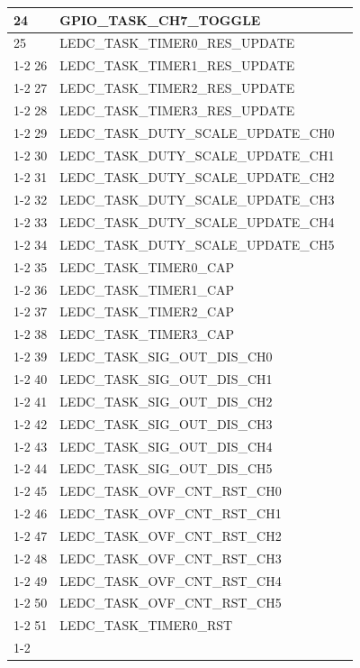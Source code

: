 \documentclass[main\_\_CN.tex]{subfiles}
\begin{document}
\begin{longtable}{ | l | l | l | }
24  & GPIO\_TASK\_CH7\_TOGGLE  &  \\ \hline
25  & LEDC\_TASK\_TIMER0\_RES\_UPDATE      & \nameref{mod:ledpwm} \\ \cline{1-2}
26  & LEDC\_TASK\_TIMER1\_RES\_UPDATE      & \\ \cline{1-2}
27  & LEDC\_TASK\_TIMER2\_RES\_UPDATE      & \\ \cline{1-2}
28  & LEDC\_TASK\_TIMER3\_RES\_UPDATE      & \\ \cline{1-2}
29  & LEDC\_TASK\_DUTY\_SCALE\_UPDATE\_CH0 & \\ \cline{1-2}
30  & LEDC\_TASK\_DUTY\_SCALE\_UPDATE\_CH1 & \\ \cline{1-2}
31  & LEDC\_TASK\_DUTY\_SCALE\_UPDATE\_CH2 & \\ \cline{1-2}
32  & LEDC\_TASK\_DUTY\_SCALE\_UPDATE\_CH3 & \\ \cline{1-2}
33  & LEDC\_TASK\_DUTY\_SCALE\_UPDATE\_CH4 & \\ \cline{1-2}
34  & LEDC\_TASK\_DUTY\_SCALE\_UPDATE\_CH5 & \\ \cline{1-2}
35  & LEDC\_TASK\_TIMER0\_CAP  & \\ \cline{1-2}
36  & LEDC\_TASK\_TIMER1\_CAP  & \\ \cline{1-2}
37  & LEDC\_TASK\_TIMER2\_CAP  & \\ \cline{1-2}
38  & LEDC\_TASK\_TIMER3\_CAP  & \\ \cline{1-2}
39  & LEDC\_TASK\_SIG\_OUT\_DIS\_CH0& \\ \cline{1-2}
40  & LEDC\_TASK\_SIG\_OUT\_DIS\_CH1& \\ \cline{1-2}
41  & LEDC\_TASK\_SIG\_OUT\_DIS\_CH2& \\ \cline{1-2}
42  & LEDC\_TASK\_SIG\_OUT\_DIS\_CH3& \\ \cline{1-2}
43  & LEDC\_TASK\_SIG\_OUT\_DIS\_CH4& \\ \cline{1-2}
44  & LEDC\_TASK\_SIG\_OUT\_DIS\_CH5& \\ \cline{1-2}
45  & LEDC\_TASK\_OVF\_CNT\_RST\_CH0& \\ \cline{1-2}
46  & LEDC\_TASK\_OVF\_CNT\_RST\_CH1& \\ \cline{1-2}
47  & LEDC\_TASK\_OVF\_CNT\_RST\_CH2& \\ \cline{1-2}
48  & LEDC\_TASK\_OVF\_CNT\_RST\_CH3& \\ \cline{1-2}
49  & LEDC\_TASK\_OVF\_CNT\_RST\_CH4& \\ \cline{1-2}
50  & LEDC\_TASK\_OVF\_CNT\_RST\_CH5& \\ \cline{1-2}
51  & LEDC\_TASK\_TIMER0\_RST  & \\ \cline{1-2}

\end{longtable}
\end{document}
